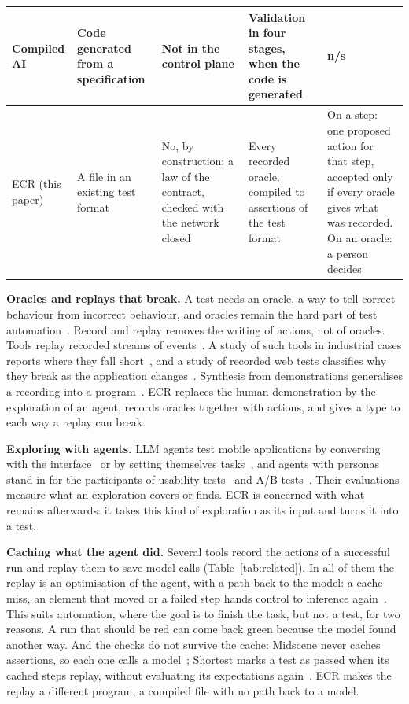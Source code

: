 \begin{table}[t]
\begin{tabular}{@{}L{2.2cm}L{3.0cm}L{3.45cm}L{3.45cm}L{3.95cm}@{}}
Compiled AI~\cite{trooskens2026compiled} & Code generated from a specification & Not in the control plane & Validation in four stages, when the code is generated & n/s \\
\midrule
ECR (this paper) & A file in an existing test format & No, by construction: a law of the contract, checked with the network closed & Every recorded oracle, compiled to assertions of the test format & On a step: one proposed action for that step, accepted only if every oracle gives what was recorded. On an oracle: a person decides \\
\bottomrule
\end{tabular}
\end{table}

\textbf{Oracles and replays that break.} A test needs an oracle, a way to tell correct behaviour from incorrect behaviour, and oracles remain the hard part of test automation~\cite{barr2015oracle}. Record and replay removes the writing of actions, not of oracles. Tools replay recorded streams of events~\cite{gomez2013reran}. A study of such tools in industrial cases reports where they fall short~\cite{lam2017record}, and a study of recorded web tests classifies why they break as the application changes~\cite{hammoudi2016why}. Synthesis from demonstrations generalises a recording into a program~\cite{dong2022webrobot}. ECR replaces the human demonstration by the exploration of an agent, records oracles together with actions, and gives a type to each way a replay can break.

\textbf{Exploring with agents.} LLM agents test mobile applications by conversing with the interface~\cite{liu2023gptdroid} or by setting themselves tasks~\cite{yoon2024droidagent}, and agents with personas stand in for the participants of usability tests~\cite{lu2025uxagent} and A/B tests~\cite{lu2025agentab}. Their evaluations measure what an exploration covers or finds. ECR is concerned with what remains afterwards: it takes this kind of exploration as its input and turns it into a test.

\textbf{Caching what the agent did.} Several tools record the actions of a successful run and replay them to save model calls (Table~\ref{tab:related}). In all of them the replay is an optimisation of the agent, with a path back to the model: a cache miss, an element that moved or a failed step hands control to inference again~\cite{stagehand,midscene,shortest,arbigent,workflowuse,musclemem,skyvern}. This suits automation, where the goal is to finish the task, but not a test, for two reasons. A run that should be red can come back green because the model found another way. And the checks do not survive the cache: Midscene never caches assertions, so each one calls a model~\cite{midscene}; Shortest marks a test as passed when its cached steps replay, without evaluating its expectations again~\cite{shortest}. ECR makes the replay a different program, a compiled file with no path back to a model.

